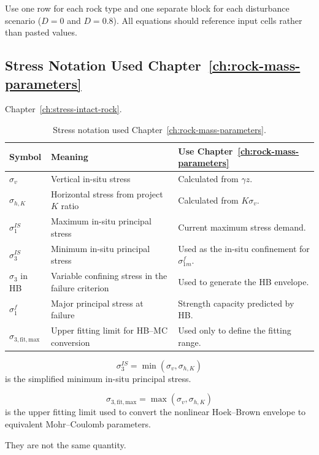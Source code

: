 \begin{notebox}
Use one row for each rock type and one separate block for each disturbance scenario
(\(D=0\) and \(D=0.8\)). All equations should reference input cells rather than pasted
values.
\end{notebox}

\subsection{Stress Notation Used Chapter~\ref{ch:rock-mass-parameters}}
 Chapter~\ref{ch:stress-intact-rock}.

\begin{table}[H]
\centering
\small
\begin{tabularx}{\textwidth}{l l Y}
\toprule
\textbf{Symbol} & \textbf{Meaning} & \textbf{Use Chapter~\ref{ch:rock-mass-parameters}} \\
\midrule
\(\sigma_v\) & Vertical in-situ stress & Calculated from \(\gamma z\). \\
\(\sigma_{h,K}\) & Horizontal stress from project \(K\) ratio & Calculated from \(K\sigma_v\). \\
\(\sigma_1^{IS}\) & Maximum in-situ principal stress & Current maximum stress demand. \\
\(\sigma_3^{IS}\) & Minimum in-situ principal stress & Used as the in-situ confinement for \(\sigma_{1m}^f\). \\
\(\sigma_3\) in HB & Variable confining stress in the failure criterion & Used to generate the HB envelope. \\
\(\sigma_1^f\) & Major principal stress at failure & Strength capacity predicted by HB. \\
\(\sigma_{3,\mathrm{fit,max}}\) & Upper fitting limit for HB--MC conversion & Used only to define the fitting range. \\
\bottomrule
\end{tabularx}
\caption{Stress notation used Chapter~\ref{ch:rock-mass-parameters}.}
\label{tab:stress_notation}
\end{table}

\begin{keybox}
\[
\sigma_3^{IS}=\min(\sigma_v,\sigma_{h,K})
\]
is the simplified minimum in-situ principal stress.

\[
\sigma_{3,\mathrm{fit,max}}=\max(\sigma_v,\sigma_{h,K})
\]
is the upper fitting limit used to convert the nonlinear Hoek--Brown envelope to
equivalent Mohr--Coulomb parameters.

They are not the same quantity.
\end{keybox}

